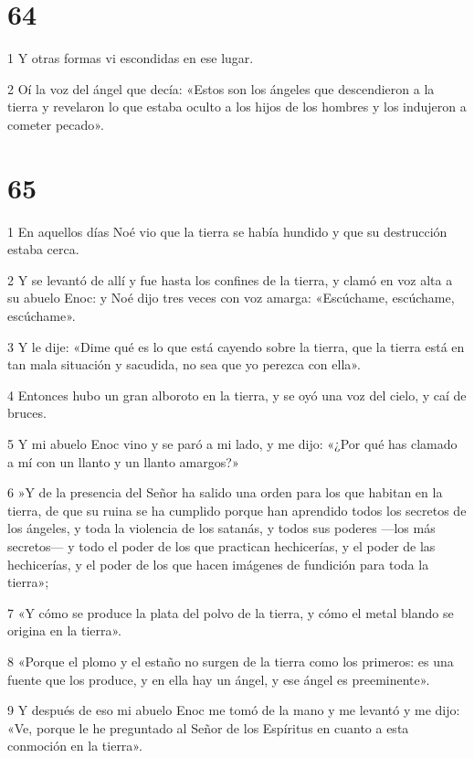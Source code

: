 \chapter{64}

\par 1 Y otras formas vi escondidas en ese lugar.
\par 2 Oí la voz del ángel que decía: «Estos son los ángeles que descendieron a la tierra y revelaron lo que estaba oculto a los hijos de los hombres y los indujeron a cometer pecado».

\chapter{65}

\par 1 En aquellos días Noé vio que la tierra se había hundido y que su destrucción estaba cerca.
\par 2 Y se levantó de allí y fue hasta los confines de la tierra, y clamó en voz alta a su abuelo Enoc: y Noé dijo tres veces con voz amarga: «Escúchame, escúchame, escúchame».
\par 3 Y le dije: «Dime qué es lo que está cayendo sobre la tierra, que la tierra está en tan mala situación y sacudida, no sea que yo perezca con ella».
\par 4 Entonces hubo un gran alboroto en la tierra, y se oyó una voz del cielo, y caí de bruces.
\par 5 Y mi abuelo Enoc vino y se paró a mi lado, y me dijo: «¿Por qué has clamado a mí con un llanto y un llanto amargos?»
\par 6 »Y de la presencia del Señor ha salido una orden para los que habitan en la tierra, de que su ruina se ha cumplido porque han aprendido todos los secretos de los ángeles, y toda la violencia de los satanás, y todos sus poderes —los más secretos— y todo el poder de los que practican hechicerías, y el poder de las hechicerías, y el poder de los que hacen imágenes de fundición para toda la tierra»;
\par 7 «Y cómo se produce la plata del polvo de la tierra, y cómo el metal blando se origina en la tierra».
\par 8 «Porque el plomo y el estaño no surgen de la tierra como los primeros: es una fuente que los produce, y en ella hay un ángel, y ese ángel es preeminente».
\par 9 Y después de eso mi abuelo Enoc me tomó de la mano y me levantó y me dijo: «Ve, porque le he preguntado al Señor de los Espíritus en cuanto a esta conmoción en la tierra».
